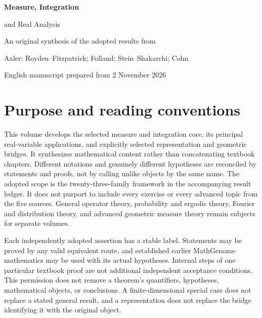 \documentclass[11pt,oneside,openany]{book}
\theoremstyle{definition}
\theoremstyle{remark}
\begin{document}
\frontmatter

\hypersetup{pageanchor=false}
\begin{titlepage}
\centering\vspace*{24mm}
{\Huge\bfseries Measure, Integration\par and Real Analysis\par}
\vspace{12mm}{\Large Unified Notes for MathGenome\par}
\vspace{10mm}{\large D11: twenty-three mathematical topic families\par}
\vfill
An original synthesis of the adopted results from\par
Axler; Royden--Fitzpatrick; Folland; Stein--Shakarchi; Cohn\par
\vspace{8mm}English manuscript prepared from 2 November 2026\par
\end{titlepage}
\hypersetup{pageanchor=true}
\chapter*{Purpose and reading conventions}
This volume develops the selected measure and integration core, its principal
real-variable applications, and explicitly selected representation and geometric
bridges. It synthesizes mathematical content rather than concatenating textbook
chapters. Different notations and genuinely different hypotheses are reconciled
by statements and proofs, not by calling unlike objects by the same name.
The adopted scope is the twenty-three-family framework in the accompanying
result ledger. It does not purport to include every exercise or every advanced
topic from the five sources. General operator theory, probability and ergodic
theory, Fourier and distribution theory, and advanced geometric measure theory
remain subjects for separate volumes.

Each independently adopted assertion has a stable label. Statements may be
proved by any valid equivalent route, and established earlier MathGenome
mathematics may be used with its actual hypotheses. Internal steps of one
particular textbook proof are not additional independent acceptance conditions.
This permission does not remove a theorem's quantifiers, hypotheses, mathematical
objects, or conclusions. A finite-dimensional special case does not replace
a stated general result, and a representation does not replace the bridge
identifying it with the original object.
\end{document}
